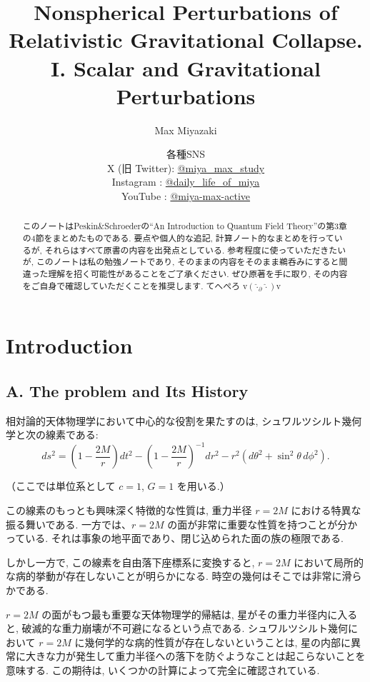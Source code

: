 \documentclass[a4paper,12pt]{article}
\title{Nonspherical Perturbations of Relativistic Gravitational Collapse.\\
I. Scalar and Gravitational Perturbations}
\date{各種SNS\\
    X (旧 Twitter): \href{https://x.com/miya_max_study}{@miya\_max\_study}\\
    Instagram : \href{https://www.instagram.com/daily_life_of_miya/}{@daily\_life\_of\_miya}\\
    YouTube : \href{https://www.youtube.com/@miya-max-active}{@miya-max-active}
    }
\author{Max Miyazaki}
\begin{document}
\maketitle

\vspace{1cm}
\begin{abstract}
    このノートはPeskin\&Schroederの``An Introduction to Quantum Field Theory''の第3章の4節をまとめたものである. 要点や個人的な追記, 計算ノート的なまとめを行っているが, それらはすべて原書の内容を出発点としている. 参考程度に使っていただきたいが, このノートは私の勉強ノートであり, そのままの内容をそのまま鵜呑みにすると間違った理解を招く可能性があることをご了承ください. ぜひ原著を手に取り, その内容をご自身で確認していただくことを推奨します. てへぺろ v$({\hat{\cdot}_\partial \hat{\cdot}})$v
\end{abstract}

\newpage

\section*{Introduction}
\subsection*{A. The problem and Its History}
相対論的天体物理学において中心的な役割を果たすのは, シュワルツシルト幾何学と次の線素である:
\begin{equation}
    ds^2 = \left(1 - \frac{2M}{r} \right) dt^2 - \left(1 - \frac{2M}{r} \right)^{-1} dr^2 - r^2 \left( d\theta^2 + \sin^2 \theta\, d\phi^2 \right).
\end{equation}

（ここでは単位系として $c = 1$, $G = 1$ を用いる.）

この線素のもっとも興味深く特徴的な性質は, 重力半径 $r = 2M$ における特異な振る舞いである. 一方では、$r = 2M$ の面が非常に重要な性質を持つことが分かっている. それは事象の地平面であり、閉じ込められた面の族の極限である.

しかし一方で, この線素を自由落下座標系に変換すると, $r = 2M$ において局所的な病的挙動が存在しないことが明らかになる. 時空の幾何はそこでは非常に滑らかである. 

$r = 2M$ の面がもつ最も重要な天体物理学的帰結は, 星がその重力半径内に入ると, 破滅的な重力崩壊が不可避になるという点である. シュワルツシルト幾何において $r = 2M$ に幾何学的な病的性質が存在しないということは, 星の内部に異常に大きな力が発生して重力半径への落下を防ぐようなことは起こらないことを意味する. この期待は, いくつかの計算によって完全に確認されている.
\end{document}
